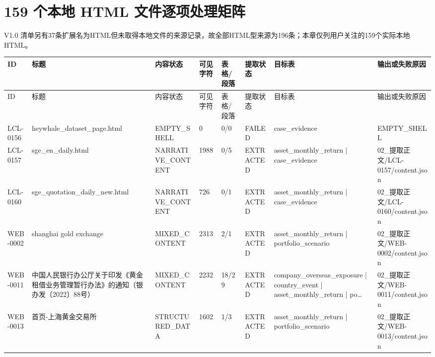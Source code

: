 \chapter{159 个本地 HTML 文件逐项处理矩阵}
V1.0 清单另有37条扩展名为HTML但未取得本地文件的来源记录，故全部HTML型来源为196条；本章仅列用户关注的159个实际本地HTML。
\clearpage
\begin{landscape}\begingroup\setlength{\tabcolsep}{2pt}\scriptsize
\begin{longtable}{p{1.8cm}p{4.2cm}p{3.0cm}p{1.4cm}p{1.6cm}p{2.4cm}p{4.2cm}p{4.2cm}}
\toprule
ID & 标题 & 内容状态 & 可见字符 & 表格/段落 & 提取状态 & 目标表 & 输出或失败原因\\
\midrule\endfirsthead
\toprule ID & 标题 & 内容状态 & 可见字符 & 表格/段落 & 提取状态 & 目标表 & 输出或失败原因\\\midrule\endhead
LCL-0156 & heywhale\_\allowbreak{}dataset\_\allowbreak{}page.html & EMPTY\_\allowbreak{}SHELL & 0 & 0/\allowbreak{}0 & FAILED & case\_\allowbreak{}evidence & EMPTY\_\allowbreak{}SHELL\\
LCL-0157 & sge\_\allowbreak{}en\_\allowbreak{}daily.html & NARRATIVE\_\allowbreak{}CONTENT & 1988 & 0/\allowbreak{}5 & EXTRACTED & asset\_\allowbreak{}monthly\_\allowbreak{}return | case\_\allowbreak{}evidence & 02\_\allowbreak{}提取正文/\allowbreak{}LCL-0157/\allowbreak{}content.json\\
LCL-0160 & sge\_\allowbreak{}quotation\_\allowbreak{}daily\_\allowbreak{}new.html & NARRATIVE\_\allowbreak{}CONTENT & 726 & 0/\allowbreak{}1 & EXTRACTED & asset\_\allowbreak{}monthly\_\allowbreak{}return | case\_\allowbreak{}evidence & 02\_\allowbreak{}提取正文/\allowbreak{}LCL-0160/\allowbreak{}content.json\\
WEB-0002 & shanghai gold exchange & MIXED\_\allowbreak{}CONTENT & 2313 & 2/\allowbreak{}1 & EXTRACTED & asset\_\allowbreak{}monthly\_\allowbreak{}return | portfolio\_\allowbreak{}scenario & 02\_\allowbreak{}提取正文/\allowbreak{}WEB-0002/\allowbreak{}content.json\\
WEB-0011 & 中国人民银行办公厅关于印发《黄金租借业务管理暂行办法》的通知（银办发〔2022〕88号） & MIXED\_\allowbreak{}CONTENT & 2232 & 18/\allowbreak{}29 & EXTRACTED & company\_\allowbreak{}overseas\_\allowbreak{}exposure | country\_\allowbreak{}event | asset\_\allowbreak{}monthly\_\allowbreak{}return | po… & 02\_\allowbreak{}提取正文/\allowbreak{}WEB-0011/\allowbreak{}content.json\\
WEB-0013 & 首页-上海黄金交易所 & STRUCTURED\_\allowbreak{}DATA & 1602 & 1/\allowbreak{}3 & EXTRACTED & asset\_\allowbreak{}monthly\_\allowbreak{}return | portfolio\_\allowbreak{}scenario & 02\_\allowbreak{}提取正文/\allowbreak{}WEB-0013/\allowbreak{}content.json\\

\end{longtable}
\end{landscape}
